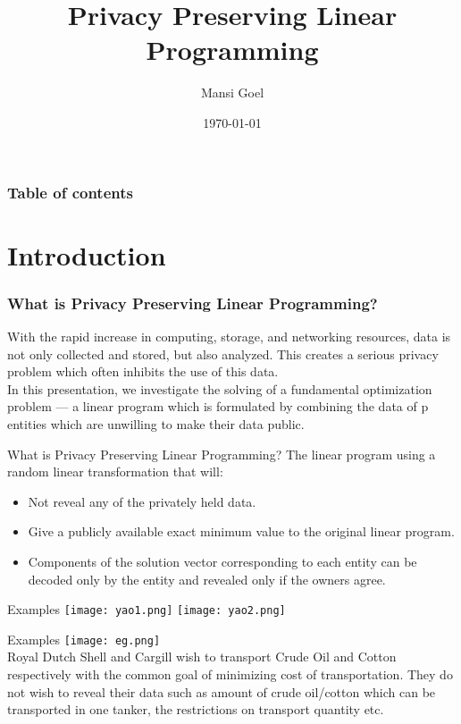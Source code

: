 \documentclass[9pt]{beamer}
\title{Privacy Preserving Linear Programming}
\author{Mansi Goel}
\institute{Department of Mathematics \\ School of Natural Sciences \\ Shiv Nadar University }
\begin{document}
\begin{frame}
\titlepage
\date{\today}   
\end{frame}

\begin{frame}
\frametitle{Table of contents}
\tableofcontents
\end{frame}


\section{Introduction}

\begin{frame}
\frametitle{What is Privacy Preserving Linear Programming?}
With the rapid increase in computing, storage, and networking resources, data is not only collected and stored, but also analyzed. This creates a serious privacy problem which often inhibits the use of this data.\\
\vspace{0.2cm}
In this presentation, we investigate the solving of a fundamental optimization problem — a linear program which is formulated by combining the data of p entities which are unwilling to make their data public. \\
\end{frame}

\begin{frame}{What is Privacy Preserving Linear Programming?}
The linear program using a random linear transformation that will:\\
\vspace{0.1cm}
\begin{itemize}
    \item Not reveal any of the privately held data.
    
    \item Give a publicly available exact minimum value to the original linear program. 
    
    \item Components of the solution vector corresponding to each entity can be decoded only by the entity and revealed only if the owners agree.
\end{itemize}
\end{frame}

\begin{frame}{Examples}
\texttt{[image: yao1.png]}
\texttt{[image: yao2.png]} 
\end{frame}

\begin{frame}{Examples}
\centering
\texttt{[image: eg.png]}\\
\vspace{0.1cm}
Royal Dutch Shell and Cargill wish to transport Crude Oil and Cotton respectively with the common goal of minimizing cost of transportation. They do not wish to reveal their data such as amount of crude oil/cotton which can be transported in one tanker, the restrictions on transport quantity etc. 
\end{frame}
\end{document}
